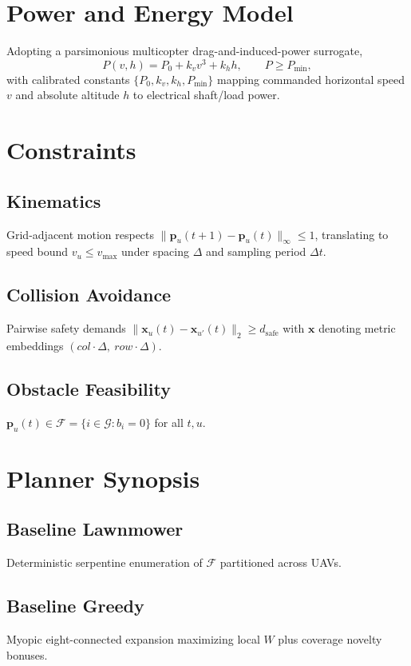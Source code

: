 \documentclass[conference]{IEEEtran}
\begin{document}
\section{Power and Energy Model}
Adopting a parsimonious multicopter drag-and-induced-power surrogate,
\begin{equation}
P(v,h) = P_0 + k_v v^3 + k_h h,\qquad P\ge P_{\min},
\label{eq:power}
\end{equation}
with calibrated constants $\{P_0,k_v,k_h,P_{\min}\}$ mapping commanded horizontal speed $v$ and absolute altitude $h$ to electrical shaft/load power.

\section{Constraints}
\subsection{Kinematics}
Grid-adjacent motion respects $\|\mathbf{p}_u(t{+}1)-\mathbf{p}_u(t)\|_\infty\le 1$, translating to speed bound $v_u\le v_{\max}$ under spacing $\Delta$ and sampling period $\Delta t$.

\subsection{Collision Avoidance}
Pairwise safety demands $\|\mathbf{x}_u(t)-\mathbf{x}_{u'}(t)\|_2\ge d_{\mathrm{safe}}$ with $\mathbf{x}$ denoting metric embeddings $(col\cdot\Delta,\ row\cdot\Delta)$.

\subsection{Obstacle Feasibility}
$\mathbf{p}_u(t)\in\mathcal{F}=\{i\in\mathcal{G}:b_i=0\}$ for all $t,u$.

\section{Planner Synopsis}
\subsection{Baseline Lawnmower}
Deterministic serpentine enumeration of $\mathcal{F}$ partitioned across UAVs.

\subsection{Baseline Greedy}
Myopic eight-connected expansion maximizing local $W$ plus coverage novelty bonuses.
\end{document}
